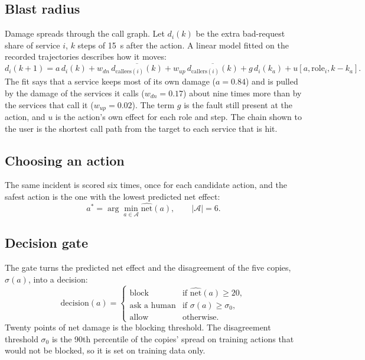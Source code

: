 \subsection{Blast radius}
Damage spreads through the call graph. Let $d_i(k)$ be the extra bad-request share of service $i$, $k$ steps of 15~s after the action. A linear model fitted on the recorded trajectories describes how it moves:
\begin{equation}
d_i(k{+}1) = a\, d_i(k) + w_{dn}\, \overline{d_{\mathrm{callees}(i)}(k)} + w_{up}\, \overline{d_{\mathrm{callers}(i)}(k)} + g\, d_i(k_a) + u[a, \mathrm{role}_i, k - k_a].
\end{equation}
The fit says that a service keeps most of its own damage ($a = 0.84$) and is pulled by the damage of the services it calls ($w_{dn} = 0.17$) about nine times more than by the services that call it ($w_{up} = 0.02$). The term $g$ is the fault still present at the action, and $u$ is the action's own effect for each role and step. The chain shown to the user is the shortest call path from the target to each service that is hit.

\subsection{Choosing an action}
The same incident is scored six times, once for each candidate action, and the safest action is the one with the lowest predicted net effect:
\begin{equation}
a^{*} = \arg\min_{a \in \mathcal{A}} \widehat{\mathrm{net}}(a), \qquad |\mathcal{A}| = 6.
\end{equation}

\subsection{Decision gate}
The gate turns the predicted net effect and the disagreement of the five copies, $\sigma(a)$, into a decision:
\begin{equation}
\mathrm{decision}(a) =
\begin{cases}
\text{block} & \text{if } \widehat{\mathrm{net}}(a) \geq 20,\\
\text{ask a human} & \text{if } \sigma(a) \geq \sigma_0,\\
\text{allow} & \text{otherwise.}
\end{cases}
\end{equation}
Twenty points of net damage is the blocking threshold. The disagreement threshold $\sigma_0$ is the 90th percentile of the copies' spread on training actions that would not be blocked, so it is set on training data only.

